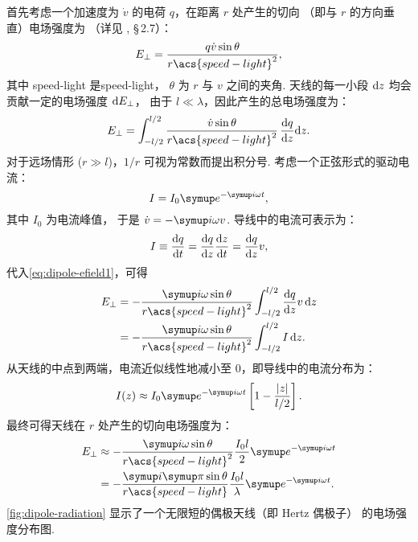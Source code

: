 首先考虑一个加速度为 $\dot{v}$ 的电荷 $q$，在距离 $r$ 处产生的切向
（即与 $r$ 的方向垂直）电场强度为
（详见 , \S\,2.7）：
\begin{equation}
  \label{eq:q-efield}
  E_{\perp} = \frac{q \dot{v} \sin\theta}{r \acs{speed-light}^2} ,
\end{equation}
其中
\acs{speed-light} 是\acl{speed-light}，
$\theta$ 为 $r$ 与 $v$ 之间的夹角.
天线的每一小段 $\mathrm{d}z$ 均会贡献一定的电场强度 $\mathrm{d}E_{\perp}$，
由于 $l \ll \lambda$，因此产生的总电场强度为：
\begin{equation}
  \label{eq:dipole-efield1}
  E_{\perp} = \int_{-l/2}^{l/2}
    \frac{\dot{v} \sin\theta}{r \acs{speed-light}^2} \,\diff{q}{z}\D{z} .
\end{equation}
对于远场情形 ($r \gg l$)，$1/r$ 可视为常数而提出积分号.
考虑一个正弦形式的驱动电流：
\begin{equation}
  \label{eq:dipole-current}
  I = I_0 \Ce^{-\Ci \omega t} ,
\end{equation}
其中 $I_0$ 为电流峰值，
于是 $\dot{v} = -\Ci \omega v$.
导线中的电流可表示为：
\begin{equation}
  \label{eq:wire-current}
  I \equiv \frac{\mathrm{d}q}{\mathrm{d}t} = \frac{\mathrm{d}q}{\mathrm{d}z} \frac{\mathrm{d}z}{\mathrm{d}t} = \frac{\mathrm{d}q}{\mathrm{d}z} v ,
\end{equation}
代入\autoref{eq:dipole-efield1}，可得
\begin{align}
  \label{eq:dipole-efield2}
  E_{\perp}
    & = -\frac{\Ci\omega \sin\theta}{r \acs{speed-light}^2}
      \int_{-l/2}^{l/2} \diff{q}{z} v \,\D{z} \\
    & = -\frac{\Ci\omega \sin\theta}{r \acs{speed-light}^2}
      \int_{-l/2}^{l/2} I\,\D{z} .
\end{align}
从天线的中点到两端，电流近似线性地减小至 0，即导线中的电流分布为：
\begin{equation}
  \label{eq:dipole-current-dist}
  I(z) \approx I_0 \Ce^{-\Ci\omega t}
    \left[ 1 - \frac{|z|}{l/2} \right] .
\end{equation}
最终可得天线在 $r$ 处产生的切向电场强度为：
\begin{align}
  E_{\perp}
    & \approx -\frac{\Ci\omega \sin\theta}{r \acs{speed-light}^2}
      \frac{I_0 l}{2} \Ce^{-\Ci\omega t} \\
    & = -\frac{\Ci\Cpi \sin\theta}{r \acs{speed-light}}
      \frac{I_0 l}{\lambda} \Ce^{-\Ci\omega t} .
    \label{eq:dipole-efield}
\end{align}
\autoref{fig:dipole-radiation} 显示了一个无限短的偶极天线（即 Hertz 偶极子）
的电场强度分布图.

